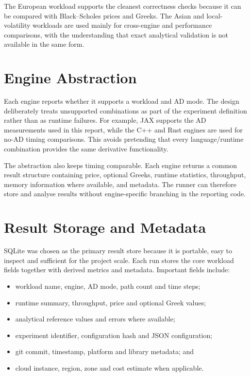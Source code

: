 The European workload supports the cleanest correctness checks because it can be compared with Black--Scholes prices and Greeks. The Asian and local-volatility workloads are used mainly for cross-engine and performance comparisons, with the understanding that exact analytical validation is not available in the same form.

\section{Engine Abstraction}

Each engine reports whether it supports a workload and AD mode. The design deliberately treats unsupported combinations as part of the experiment definition rather than as runtime failures. For example, JAX supports the AD measurements used in this report, while the C++ and Rust engines are used for no-AD timing comparisons. This avoids pretending that every language/runtime combination provides the same derivative functionality.

The abstraction also keeps timing comparable. Each engine returns a common result structure containing price, optional Greeks, runtime statistics, throughput, memory information where available, and metadata. The runner can therefore store and analyse results without engine-specific branching in the reporting code.

\section{Result Storage and Metadata}

SQLite was chosen as the primary result store because it is portable, easy to inspect and sufficient for the project scale. Each run stores the core workload fields together with derived metrics and metadata. Important fields include:
\begin{itemize}
    \item workload name, engine, AD mode, path count and time steps;
    \item runtime summary, throughput, price and optional Greek values;
    \item analytical reference values and errors where available;
    \item experiment identifier, configuration hash and JSON configuration;
    \item git commit, timestamp, platform and library metadata; and
    \item cloud instance, region, zone and cost estimate when applicable.
\end{itemize}

